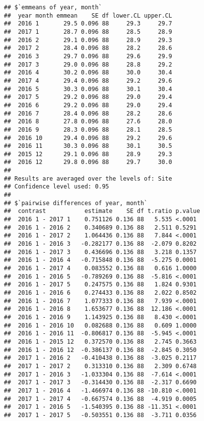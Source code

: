 \documentclass[
]{article}
\begin{document}
\begin{verbatim}
## $`emmeans of year, month`
##  year month emmean    SE df lower.CL upper.CL
##  2016 1       29.5 0.096 88     29.3     29.7
##  2017 1       28.7 0.096 88     28.5     28.9
##  2016 2       29.1 0.096 88     28.9     29.3
##  2017 2       28.4 0.096 88     28.2     28.6
##  2016 3       29.7 0.096 88     29.6     29.9
##  2017 3       29.0 0.096 88     28.8     29.2
##  2016 4       30.2 0.096 88     30.0     30.4
##  2017 4       29.4 0.096 88     29.2     29.6
##  2016 5       30.3 0.096 88     30.1     30.4
##  2017 5       29.2 0.096 88     29.0     29.4
##  2016 6       29.2 0.096 88     29.0     29.4
##  2016 7       28.4 0.096 88     28.2     28.6
##  2016 8       27.8 0.096 88     27.6     28.0
##  2016 9       28.3 0.096 88     28.1     28.5
##  2016 10      29.4 0.096 88     29.2     29.6
##  2016 11      30.3 0.096 88     30.1     30.5
##  2015 12      29.1 0.096 88     28.9     29.3
##  2016 12      29.8 0.096 88     29.7     30.0
## 
## Results are averaged over the levels of: Site 
## Confidence level used: 0.95 
## 
## $`pairwise differences of year, month`
##  contrast           estimate    SE df t.ratio p.value
##  2016 1 - 2017 1    0.751126 0.136 88   5.535 <.0001 
##  2016 1 - 2016 2    0.340689 0.136 88   2.511 0.5291 
##  2016 1 - 2017 2    1.064436 0.136 88   7.844 <.0001 
##  2016 1 - 2016 3   -0.282177 0.136 88  -2.079 0.8202 
##  2016 1 - 2017 3    0.436696 0.136 88   3.218 0.1357 
##  2016 1 - 2016 4   -0.715848 0.136 88  -5.275 0.0001 
##  2016 1 - 2017 4    0.083552 0.136 88   0.616 1.0000 
##  2016 1 - 2016 5   -0.789269 0.136 88  -5.816 <.0001 
##  2016 1 - 2017 5    0.247575 0.136 88   1.824 0.9301 
##  2016 1 - 2016 6    0.274433 0.136 88   2.022 0.8502 
##  2016 1 - 2016 7    1.077333 0.136 88   7.939 <.0001 
##  2016 1 - 2016 8    1.653677 0.136 88  12.186 <.0001 
##  2016 1 - 2016 9    1.143925 0.136 88   8.430 <.0001 
##  2016 1 - 2016 10   0.082688 0.136 88   0.609 1.0000 
##  2016 1 - 2016 11  -0.806817 0.136 88  -5.945 <.0001 
##  2016 1 - 2015 12   0.372570 0.136 88   2.745 0.3663 
##  2016 1 - 2016 12  -0.386137 0.136 88  -2.845 0.3050 
##  2017 1 - 2016 2   -0.410438 0.136 88  -3.025 0.2117 
##  2017 1 - 2017 2    0.313310 0.136 88   2.309 0.6748 
##  2017 1 - 2016 3   -1.033304 0.136 88  -7.614 <.0001 
##  2017 1 - 2017 3   -0.314430 0.136 88  -2.317 0.6690 
##  2017 1 - 2016 4   -1.466974 0.136 88 -10.810 <.0001 
##  2017 1 - 2017 4   -0.667574 0.136 88  -4.919 0.0005 
##  2017 1 - 2016 5   -1.540395 0.136 88 -11.351 <.0001 
##  2017 1 - 2017 5   -0.503551 0.136 88  -3.711 0.0356 

\end{verbatim}
\end{document}
